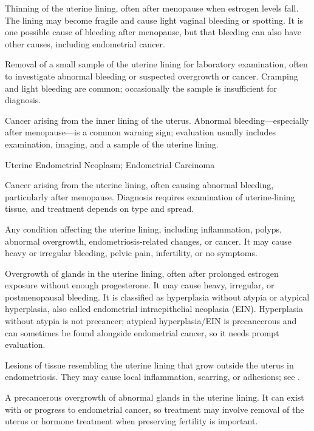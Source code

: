  Thinning of the uterine lining, often after menopause when estrogen
levels fall. The lining may become fragile and cause light vaginal bleeding or spotting. It is one
possible cause of bleeding after menopause, but that bleeding can also have other causes, including
endometrial cancer.

 Removal of a small sample of the uterine lining for laboratory examination, often to investigate abnormal bleeding or suspected overgrowth or cancer. Cramping and light bleeding are common; occasionally the sample is insufficient for diagnosis.

 Cancer arising from the inner lining of the uterus. Abnormal bleeding—especially after menopause—is a common warning sign; evaluation usually includes examination, imaging, and a sample of the uterine lining.

\synonyms
Uterine Endometrial Neoplasm; Endometrial Carcinoma

 Cancer arising from the uterine lining, often causing abnormal bleeding, particularly after menopause. Diagnosis requires examination of uterine-lining tissue, and treatment depends on type and spread.

 Any condition affecting the uterine lining, including inflammation, polyps, abnormal overgrowth, endometriosis-related changes, or cancer. It may cause heavy or irregular bleeding, pelvic pain, infertility, or no symptoms.

 Overgrowth of glands in the uterine lining, often after prolonged estrogen exposure without enough progesterone. It may cause heavy, irregular, or postmenopausal bleeding. It is classified as hyperplasia without atypia or atypical hyperplasia, also called endometrial intraepithelial neoplasia (EIN). Hyperplasia without atypia is not precancer; atypical hyperplasia/EIN is precancerous and can sometimes be found alongside endometrial cancer, so it needs prompt evaluation.

 Lesions of tissue resembling the uterine lining that grow outside the uterus in endometriosis. They may cause local inflammation, scarring, or adhesions; see .

 A precancerous overgrowth of abnormal glands in the uterine lining. It can exist with or progress to endometrial cancer, so treatment may involve removal of the uterus or hormone treatment when preserving fertility is important.

